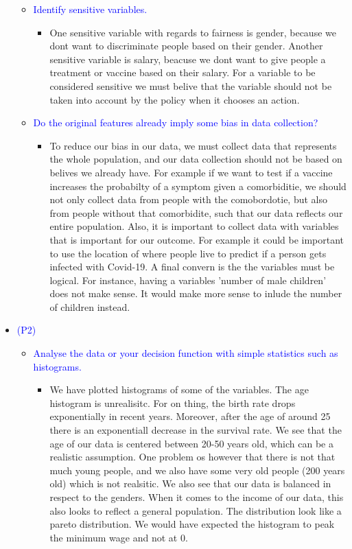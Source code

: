 \documentclass[a4paper, 12pt]{extarticle}
\begin{document}
\begin{itemize}
        \begin{itemize}
            \item \textcolor{blue}{Identify sensitive variables.}
            \begin{itemize}
                \item One sensitive variable with regards to fairness is gender, because we dont want to discriminate people based on their gender. Another sensitive variable is salary, beacuse we dont want to give people a treatment or vaccine based on their salary. For a variable to be considered sensitive we must belive that the variable should not be taken into account by the policy when it chooses an action. 
            \end{itemize}
            \item \textcolor{blue}{Do the original features already imply some bias in data collection?}
            \begin{itemize}
                \item To reduce our bias in our data, we must collect data that represents the whole population, and our data collection should not be based on belives we already have. For example if we want to test if a vaccine increases the probabilty of a symptom given a comorbiditie, we should not only collect data from people with the comobordotie, but also from people without that comorbidite, such that our data reflects our entire population. Also, it is important to collect data with variables that is important for our outcome. For example it could be important to use the location of where people live to predict if a person gets infected with Covid-19. A final convern is the the variables must be logical. For instance, having a variables 'number of male children' does not make sense. It would make more sense to inlude the number of children instead. 
            \end{itemize}
        \end{itemize}
    \item \textcolor{blue}{(P2)}
        \begin{itemize}
            \item \textcolor{blue}{Analyse the data or your decision function with simple statistics such as histograms.}
            \begin{itemize}
                \item We have plotted histograms of some of the variables.
                The age histogram is unrealisitc. For on thing, the birth rate drops exponentially in recent years. Moreover, after the age of around 25 there is an exponentiall decrease in the survival rate. We see that the age of our data is centered between 20-50 years old, which can be a realistic assumption. One problem os however that there is not that much young people, and we also have some very old people (200 years old) which is not realsitic. We also see that our data is balanced in respect to the genders. When it comes to the income of our data, this also looks to reflect a general population. The distribution look like a pareto distribution. We would have expected the histogram to peak the minimum wage and not at 0. 

\end{itemize}
\end{itemize}
\end{itemize}
\end{document}

